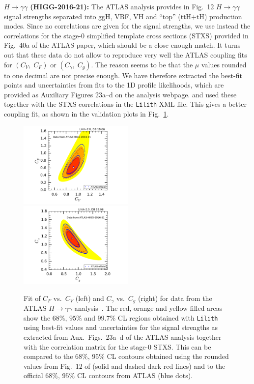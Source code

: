 {\bf\boldmath $H\to\gamma\gamma$ (HIGG-2016-21):}  
The ATLAS analysis \cite{Aaboud:2018xdt} provides in Fig.~12 $H\to\gamma\gamma$ signal strengths separated into   
ggH, VBF, VH and ``top'' (ttH+tH) production modes. Since no correlations are given for the signal strengths, we 
use instead the correlations for the stage-0 simplified template cross sections (STXS) provided in Fig.~40a of the ATLAS 
paper, which should be a close enough match. It turns out that these data do not allow to reproduce very well the 
ATLAS coupling fits for $(C_V,\;C_F)$ or $(C_\gamma,\;C_g)$. The reason seems to be that the $\mu$ values 
rounded to one decimal are not  precise enough. We have therefore extracted the best-fit points and uncertainties 
from fits to the 1D profile likelihoods, which are provided as Auxiliary Figures 23a--d on the analysis webpage. 
and used these together with the STXS correlations in the {\tt Lilith} XML file. This gives a better coupling fit, as shown 
in the validation plots in Fig.~\ref{fig:validation_atlas_gamgam}. 

\begin{figure}[bh!]\centering
\includegraphics[width=0.5\textwidth]{validation/ATLAS/HIGG-2016-21-CVCF.pdf}%
\hspace{-12mm}\includegraphics[width=0.5\textwidth]{validation/ATLAS/HIGG-2016-21-CgCGa.pdf}
\caption{Fit of $C_F$ vs.\ $C_V$ (left) and $C_\gamma$ vs.\ $C_g$ (right) for data from the ATLAS $H\to\gamma\gamma$ analysis~\cite{Sirunyan:2018koj}. The red, orange and yellow filled areas show the 
$68\%$,  $95\%$ and $99.7\%$ CL regions obtained with {\tt Lilith} using best-fit values and uncertainties for the signal strengths 
as extracted from Aux.\ Figs.~23a--d of the ATLAS analysis together with the correlation matrix for the stage-0 STXS. 
This can be compared to the $68\%$,  $95\%$ CL contours obtained using the rounded values from Fig.~12 of \cite{Sirunyan:2018koj} 
(solid and dashed dark red lines) and to the official $68\%$,  $95\%$ CL contours from ATLAS (blue dots).}
\label{fig:validation_atlas_gamgam}
\end{figure}
 
